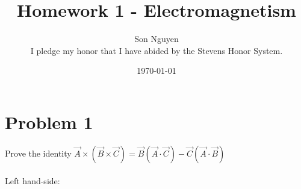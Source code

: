\documentclass[12pt]{article}
\title{Homework 1 - Electromagnetism}
\author{Son Nguyen \\
I pledge my honor that I have abided by the Stevens Honor System.}
\date{\today}
\begin{document}
\maketitle

\section*{Problem 1}
Prove the identity \(\vec{A} \times (\vec{B} \times \vec{C}) = \vec{B} (\vec{A} \cdot \vec{C}) - \vec{C}  (\vec{A} \cdot \vec{B})\) \\ \\
Left hand-side:
\end{document}
